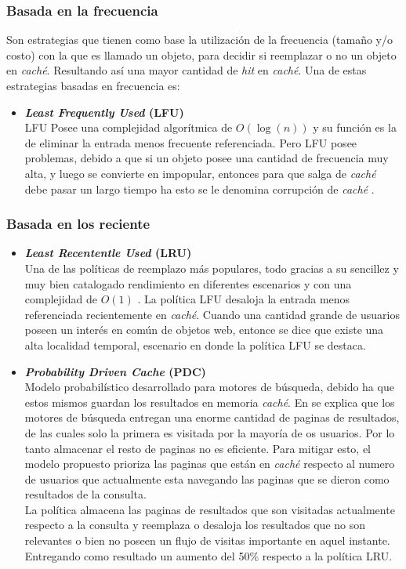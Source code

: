 \documentclass[12pt]{ociamthesis}  %
\begin{document}
\subsubsection{Basada en la frecuencia}
Son estrategias que tienen como base la utilización de la frecuencia (tamaño y/o costo) con la que es llamado un objeto, para decidir si reemplazar o no un objeto en \textit{caché}. Resultando así una mayor cantidad de \textit{hit} en \textit{caché}. Una de estas estrategias basadas en frecuencia es:
\begin{itemize}
	\item \textbf{\textit{Least Frequently Used} (LFU)}\\
	LFU Posee una complejidad algorítmica de $O(\log(n))$ y su función es la de eliminar la entrada menos frecuente referenciada. Pero LFU posee problemas, debido a que si un objeto posee una cantidad de frecuencia muy alta, y luego se convierte en impopular, entonces para que salga de \textit{caché} debe pasar un largo tiempo ha esto se le denomina corrupción de \textit{caché} \cite{wong2006web}.
\end{itemize}
\clearpage

\subsubsection{Basada en los reciente}
\begin{itemize}
	\item \textbf{\textit{Least Recententle Used} (LRU)}\\
	Una de las políticas de reemplazo más populares, todo gracias a su sencillez y muy bien catalogado rendimiento en diferentes escenarios \cite{wong2006web} y con una complejidad de  $O(1)$ . La política LFU desaloja la entrada menos referenciada recientemente en \textit{caché}. Cuando una cantidad grande de usuarios poseen un interés en común de objetos web, entonce se dice que existe una alta localidad temporal, escenario en donde la política LFU se destaca.
		
	\item \textbf{\textit{Probability Driven Cache} (PDC)\cite{lempel2003predictive}}\\
	Modelo probabilístico desarrollado para motores de búsqueda, debido ha que estos mismos guardan los resultados en memoria \textit{caché}. En \cite{lempel2003predictive} se explica que los motores de búsqueda entregan una enorme cantidad de paginas de resultados, de las cuales solo la primera es visitada por la mayoría de os usuarios. Por lo tanto almacenar el resto de paginas no es eficiente. Para mitigar esto, el modelo propuesto prioriza las paginas que están en \textit{caché} respecto al numero de usuarios que actualmente esta navegando las paginas que se dieron como resultados de la consulta.\\
	
	La política almacena las paginas de resultados que son visitadas actualmente respecto a la consulta y reemplaza o desaloja los resultados que no son relevantes o bien no poseen un flujo de visitas importante en aquel instante. Entregando como resultado un aumento del 50\% respecto a la política LRU.\\
	
\end{itemize}
\end{document}
